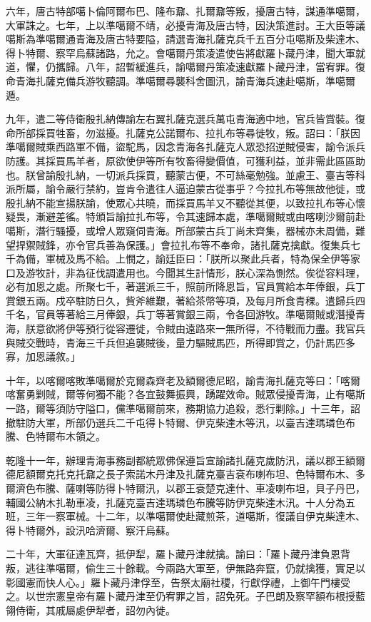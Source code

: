 \begin{pinyinscope}
六年，唐古特部噶卜倫阿爾布巴、隆布鼐、扎爾鼐等叛，擾唐古特，謀通準噶爾，大軍誅之。七年，上以準噶爾不靖，必擾青海及唐古特，因決策進討。王大臣等議噶斯為準噶爾通青海及唐古特要隘，請選青海扎薩克兵千五百分屯噶斯及柴達木、得卜特爾、察罕烏蘇諸路，允之。會噶爾丹策凌遣使告將獻羅卜藏丹津，聞大軍就道，懼，仍攜歸。八年，詔暫緩進兵，諭噶爾丹策凌速獻羅卜藏丹津，當宥罪。復命青海扎薩克備兵游牧聽調。準噶爾尋襲科舍圖汛，諭青海兵速赴噶斯，準噶爾遁。

九年，遣二等侍衛殷扎納傳諭左右翼扎薩克選兵萬屯青海適中地，官兵皆賞裝。復命所部採買牲畜，勿滋擾。扎薩克公諾爾布、拉扎布等尋徙牧，叛。詔曰：「朕因準噶爾賊乘西路軍不備，盜駝馬，因念青海各扎薩克人眾恐招逆賊侵害，諭令派兵防護。其採買馬羊者，原欲使伊等所有牧畜得變價值，可獲利益，並非需此區區助也。朕曾諭殷扎納，一切派兵採買，聽蒙古便，不可絲毫勉強。並慮王、臺吉等科派所屬，諭令嚴行禁約，豈肯令遣往人逼迫蒙古從事乎？今拉扎布等無故他徙，或殷扎納不能宣揚朕諭，使眾心共曉，而採買馬羊又不聽從其便，以致拉扎布等心懷疑畏，漸避差徭。特頒旨諭拉扎布等，令其速歸本處，準噶爾賊或由喀喇沙爾前赴噶斯，潛行騷擾，或增人眾窺伺青海。所部蒙古兵丁尚未齊集，器械亦未周備，難望捍禦賊鋒，亦令官兵善為保護。」會拉扎布等不奉命，諸扎薩克擒獻。復集兵七千為備，軍械及馬不給。上憫之，諭廷臣曰：「朕所以聚此兵者，特為保全伊等家口及游牧計，非為征伐調遣用也。今聞其生計情形，朕心深為惻然。俟從容料理，必有加恩之處。所聚七千，著選派三千，照前所降恩旨，官員賞給本年俸銀，兵丁賞銀五兩。戍卒駐防日久，貲斧維艱，著給茶幣等項，及每月所食青稞。遣歸兵四千名，官員等著給三月俸銀，兵丁等著賞銀三兩，令各回游牧。準噶爾賊或潛擾青海，朕意欲將伊等預行從容遷徙，令賊由遠路來一無所得，不待戰而力盡。我官兵與賊交戰時，青海三千兵但追襲賊後，量力驅賊馬匹，所得即賞之，仍計馬匹多寡，加恩議敘。」

十年，以喀爾喀敗準噶爾於克爾森齊老及額爾德尼昭，諭青海扎薩克等曰：「喀爾喀奮勇剿賊，爾等何獨不能？各宜鼓舞振興，踴躍效命。賊眾侵擾青海，止有噶斯一路，爾等須防守隘口，儻準噶爾前來，務期協力追殺，悉行剿除。」十三年，詔撤駐防大軍，所部仍選兵二千屯得卜特爾、伊克柴達木等汛，以臺吉達瑪璘色布騰、色特爾布木領之。

乾隆十一年，辦理青海事務副都統眾佛保遵旨宣諭諸扎薩克歲防汛，議以郡王額爾德尼額爾克托克托鼐之長子索諾木丹津及扎薩克臺吉袞布喇布坦、色特爾布木、多爾濟色布騰、薩喇等防得卜特爾汛，以郡王袞楚克達什、車凌喇布坦，貝子丹巴，輔國公納木扎勒車凌，扎薩克臺吉達瑪璘色布騰等防伊克柴達木汛。十人分為五班，三年一察軍械。十二年，以準噶爾使赴藏煎茶，道噶斯，復議自伊克柴達木、得卜特爾外，設汛哈濟爾、察汗烏蘇。

二十年，大軍征達瓦齊，抵伊犁，羅卜藏丹津就擒。諭曰：「羅卜藏丹津負恩背叛，逃往準噶爾，偷生三十餘載。今兩路大軍至，伊無路奔竄，仍就擒獲，實足以彰國憲而快人心。」羅卜藏丹津俘至，告祭太廟社稷，行獻俘禮，上御午門樓受之。以世宗憲皇帝有羅卜藏丹津至仍宥罪之旨，詔免死。子巴朗及察罕額布根授藍翎侍衛，其戚屬處伊犁者，詔勿內徙。


\end{pinyinscope}
